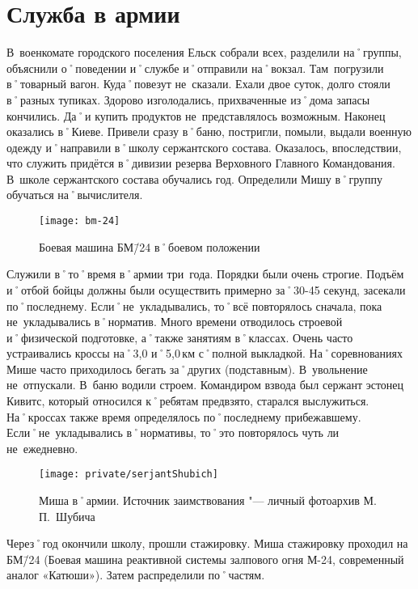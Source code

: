 ﻿\chapter{Служба в армии}
В~военкомате городского поселения Ельск собрали всех, разделили на˚группы, объяснили о˚поведении и˚службе и˚отправили на˚вокзал. Там~погрузили в˚товарный вагон. Куда˚повезут не~сказали. Ехали двое суток, долго стояли в˚разных тупиках. Здорово изголодались, прихваченные из˚дома запасы кончились. Да˚и купить продуктов не~представлялось возможным. Наконец оказались в˚Киеве. Привели сразу в˚баню, постригли, помыли, выдали военную одежду и˚направили в˚школу сержантского состава. Оказалось, впоследствии, что служить придётся в˚дивизии резерва Верховного Главного Командования. В~школе сержантского состава обучались год. Определили Мишу в˚группу обучаться на˚вычислителя.

\begin{wrapfigure}{O}{.4\textwidth}
\centering
\texttt{[image: bm-24]}
\caption[Боевая машина БМ\=/24 в˚боевом положении]{Боевая машина БМ\=/24 в˚боевом положении\footnotemark}
\label{fig:bm-24}
\end{wrapfigure}

Служили в˚то˚время в˚армии три~года. Порядки были очень строгие. Подъём и˚отбой бойцы должны были осуществить примерно за˚30-45 секунд, засекали по˚последнему. Если˚не~укладывались, то˚всё повторялось сначала, пока не~укладывались в˚норматив. Много времени отводилось строевой и˚физической подготовке, а˚также занятиям в˚классах. Очень часто устраивались кроссы на˚3,0 и˚5,0\,км с˚полной выкладкой. На˚соревнованиях Мише часто приходилось бегать за˚других (подставным). В~увольнение не~отпускали. В~баню водили строем. Командиром взвода был сержант эстонец Кивитс, который относился к˚ребятам предвзято, старался выслужиться. На˚кроссах также время определялось по˚последнему прибежавшему. Если˚не~укладывались в˚нормативы, то˚это повторялось чуть ли не~ежедневно.


\begin{figure}[H]
\texttt{[image: private/serjantShubich]}
\caption{Миша в˚армии. Источник заимствования "--- личный фотоархив М.\,П.~Шубича}
\label{fig:serjantShubich}
\end{figure}


Через˚год окончили школу, прошли стажировку. Миша стажировку проходил на БМ\=/24 (Боевая машина реактивной системы залпового огня М-24, современный аналог «Катюши»). Затем распределили по˚частям. 

